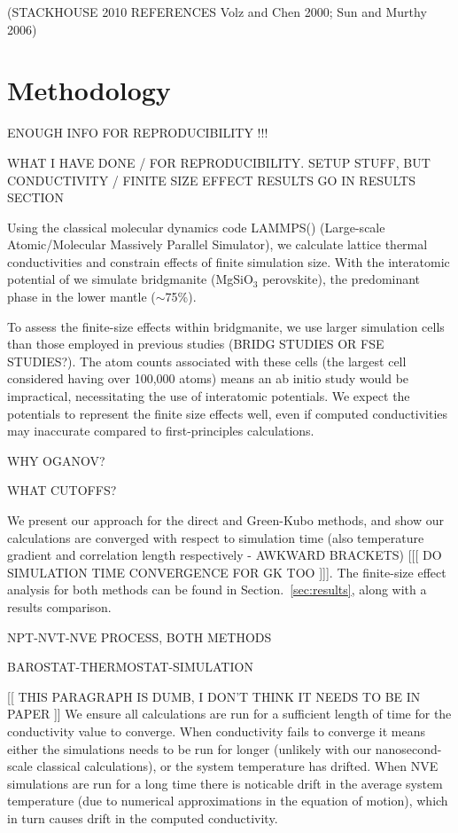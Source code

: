 \documentclass[%
preprint,                                  %
nofootinbib,
 amsmath,amssymb,
 aps,
]{revtex4-1}
\begin{document}
(STACKHOUSE 2010 REFERENCES Volz and Chen 2000; Sun and Murthy 2006)





\section{\label{sec:methodology}Methodology}

ENOUGH INFO FOR REPRODUCIBILITY !!!

WHAT I HAVE DONE / FOR REPRODUCIBILITY. SETUP STUFF, BUT CONDUCTIVITY / FINITE SIZE EFFECT RESULTS GO IN RESULTS SECTION


Using the classical molecular dynamics code LAMMPS(\citet{Plimpton1995}) (Large-scale Atomic/Molecular Massively Parallel Simulator), we calculate lattice thermal conductivities and constrain effects of finite simulation size. With the interatomic potential of \citet{Oganov2000} we simulate bridgmanite (MgSiO$_3$ perovskite), the predominant phase in the lower mantle ($\sim$75\%). 

To assess the finite-size effects within bridgmanite, we use larger simulation cells than those employed in previous studies (BRIDG STUDIES OR FSE STUDIES?). The atom counts associated with these cells (the largest cell considered having over 100,000 atoms) means an ab initio study would be impractical, necessitating the use of interatomic potentials. We expect the potentials to represent the finite size effects well, even if computed conductivities may inaccurate compared to first-principles calculations.

WHY OGANOV? 

WHAT CUTOFFS?

We present our approach for the direct and Green-Kubo methods, and show our calculations are converged with respect to simulation time (also temperature gradient and correlation length respectively - AWKWARD BRACKETS) [[[  DO SIMULATION TIME CONVERGENCE FOR GK TOO ]]]. The finite-size effect analysis for both methods can be found in Section.~\ref{sec:results}, along with a results comparison.

NPT-NVT-NVE PROCESS, BOTH METHODS

BAROSTAT-THERMOSTAT-SIMULATION

[[ THIS PARAGRAPH IS DUMB, I DON'T THINK IT NEEDS TO BE IN PAPER ]] We ensure all calculations are run for a sufficient length of time for the conductivity value to converge. When conductivity fails to converge it means either the simulations needs to be run for longer (unlikely with our nanosecond-scale classical calculations), or the system temperature has drifted. When NVE simulations are run for a long time there is noticable drift in the average system temperature (due to numerical approximations in the equation of motion), which in turn causes drift in the computed conductivity. 
\end{document}
